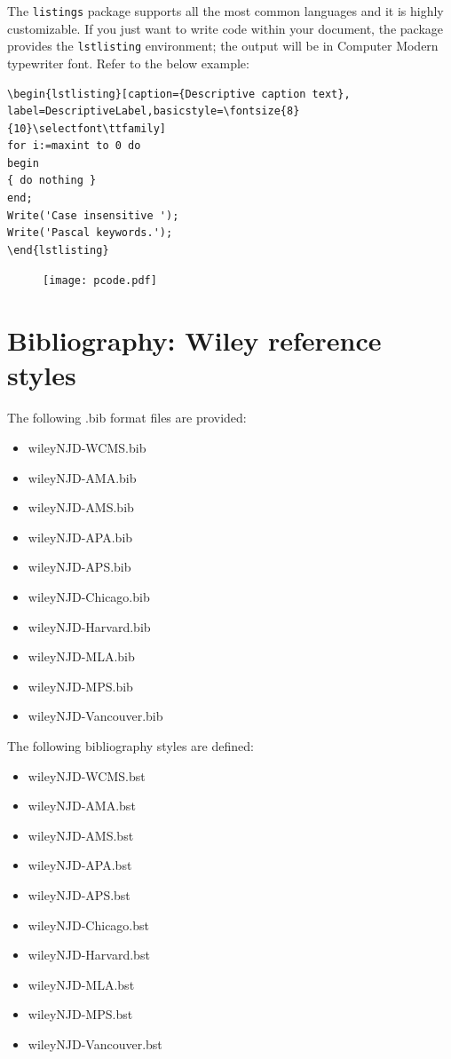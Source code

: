 \documentclass[11pt]{article}
\begin{document}
The {\tt listings} package supports all the most common languages and it is highly customizable. If you just want to write code within your document, the package provides the {\tt lstlisting} environment; the output will be in Computer Modern typewriter font. Refer to the below example:

\begin{verbatim}
\begin{lstlisting}[caption={Descriptive caption text},
label=DescriptiveLabel,basicstyle=\fontsize{8}{10}\selectfont\ttfamily]
for i:=maxint to 0 do
begin
{ do nothing }
end;
Write('Case insensitive ');
Write('Pascal keywords.');
\end{lstlisting}
\end{verbatim}

\begin{figure}[!h]
\vspace*{-10pt}
\hspace*{-8pt}\noindent\texttt{[image: pcode.pdf]}
\vspace*{-10pt}
\end{figure}


\section{Bibliography: Wiley reference styles}
\label{sec6}

The following .bib format f{i}les are provided:
\begin{itemize}
\item wileyNJD-WCMS.bib
\item wileyNJD-AMA.bib
\item wileyNJD-AMS.bib
\item wileyNJD-APA.bib
\item wileyNJD-APS.bib
\item wileyNJD-Chicago.bib
\item wileyNJD-Harvard.bib
\item wileyNJD-MLA.bib
\item wileyNJD-MPS.bib
\item wileyNJD-Vancouver.bib
\end{itemize}


\noindent The following bibliography styles are def{i}ned:
\begin{itemize}
\item wileyNJD-WCMS.bst
\item wileyNJD-AMA.bst
\item wileyNJD-AMS.bst
\item wileyNJD-APA.bst
\item wileyNJD-APS.bst
\item wileyNJD-Chicago.bst
\item wileyNJD-Harvard.bst
\item wileyNJD-MLA.bst
\item wileyNJD-MPS.bst
\item wileyNJD-Vancouver.bst
\end{itemize}
\end{document}
